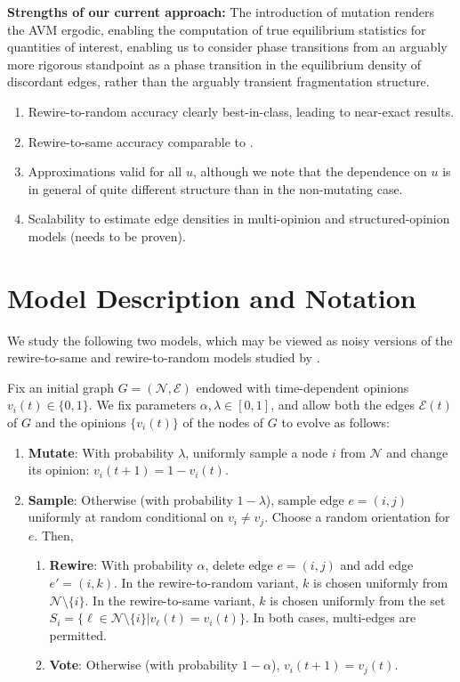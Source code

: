\documentclass[english]{scrartcl}
\begin{document}
	\textbf{Strengths of our current approach:}
		The introduction of mutation renders the AVM ergodic, enabling the computation of true equilibrium statistics for quantities of interest, enabling us to consider phase transitions from an arguably more rigorous standpoint as a phase transition in the equilibrium density of discordant edges, rather than the arguably transient fragmentation structure. 
	\begin{enumerate}
		\item Rewire-to-random accuracy clearly best-in-class, leading to near-exact results. 
		\item Rewire-to-same accuracy comparable to \cite{Demirel2012}.
		\item Approximations valid for all $u$, although we note that the dependence on $u$ is in general of quite different structure than in the non-mutating case. 
		\item Scalability to estimate edge densities in multi-opinion and structured-opinion models (needs to be proven).
	\end{enumerate}



\section{Model Description and Notation}
	
	We study the following two models, which may be viewed as noisy versions of the rewire-to-same and rewire-to-random models studied by \cite{Durrett2012}. 

	Fix an initial graph $G = (\mathcal{N}, \mathcal{E})$ endowed with time-dependent opinions $v_i(t) \in \{0,1\}$. 
	We fix parameters $\alpha,\lambda \in [0,1]$, and allow both the edges $\mathcal{E}(t)$ of $G$ and the opinions $\{v_i(t)\}$ of the nodes of $G$ to evolve as follows:  
	\begin{enumerate}
		\item \textbf{Mutate}: With probability $\lambda$, uniformly sample a node $i$ from $\mathcal{N}$ and change its opinion: $v_i(t+1) = 1-v_i(t) $. 
		\item \textbf{Sample}: Otherwise (with probability $1-\lambda$), sample edge $e = (i,j)$ uniformly at random conditional on $v_i \neq v_j$. Choose a random orientation for $e$.  Then, 
		\begin{enumerate}
			\item \textbf{Rewire}: With probability $\alpha$, delete edge $e = (i,j)$ and add edge $e' = (i,k)$. In the rewire-to-random variant, $k$ is chosen uniformly from $\mathcal{N}\setminus \{i\}$. In the rewire-to-same variant, $k$ is chosen uniformly from the set $S_i = \{\ell \in \mathcal{N}\setminus \{i\} | v_\ell(t) = v_i(t)\}$. In both cases, multi-edges are permitted. 
			\item \textbf{Vote}: Otherwise (with probability $1-\alpha$),  $v_i(t+1) = v_j(t)$. 
		\end{enumerate}
	\end{enumerate}
	
\end{document}
